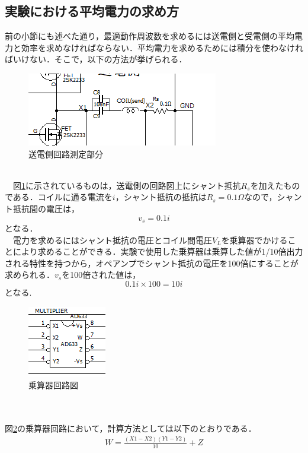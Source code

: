 \documentclass[12pt]{jarticle}
\begin{document}
 \subsection{実験における平均電力の求め方}
 前の小節にも述べた通り，最適動作周波数を求めるには送電側と受電側の平均電力と効率を求めなければならない．平均電力を求めるためには積分を使わなければいけない．そこで，以下の方法が挙げられる．
 \begin{figure}[h]
 	\centering
 	\includegraphics[]{191127shunt.png}
 	\caption{送電側回路測定部分}
 	\label{fig:shunt}
 \end{figure}
\\　図\ref{fig:shunt}に示されているものは，送電側の回路図上にシャント抵抗$R_s$を加えたものである．コイルに通る電流を$i$，シャント抵抗の抵抗は$R_s=0.1\Omega$なので，シャント抵抗間の電圧は，
\begin{equation}
v_s=0.1i
\end{equation}
となる．\\
　電力を求めるにはシャント抵抗の電圧とコイル間電圧$V_L$を乗算器でかけることにより求めることができる．実験で使用した乗算器は乗算した値が1/10倍出力される特性を持つから，オペアンプでシャント抵抗の電圧を100倍にすることが求められる．$v_s$を100倍された値は，
\begin{equation}
0.1i \times 100=10i
\end{equation}
となる.
 \begin{figure}[h]
	\centering
	\includegraphics[]{191127zouhuku.png}
	\caption{乗算器回路図}
	\label{fig:jozan}
\end{figure}
　\\ \\図\ref{fig:jozan}の乗算器回路において，計算方法としては以下のとおりである．
\begin{eqnarray}
W=\frac{(X1-X2)(Y1-Y2)}{10}+Z
\end{eqnarray}
\end{document}
